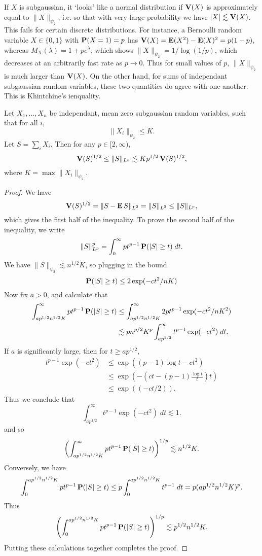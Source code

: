 If $X$ is subgaussian, it `looks' like a normal distribution if $\operatorname{\mathbf{V}}(X)$ is approximately equal to $\| X \|_{\psi_2}$, i.e. so that with very large probability we have $|X| \lesssim \operatorname{\mathbf{V}}(X)$. This fails for certain discrete distributions. For instance, a Bernoulli random variable $X \in \{ 0, 1 \}$ with $\mathbf{P}(X = 1) = p$ has $\operatorname{\mathbf{V}}(X) = \operatorname{\mathbf{E}}(X^2) - \operatorname{\mathbf{E}}(X)^2 = p(1-p)$, whereas $M_X(\lambda) = 1 + pe^\lambda$, which shows $\| X \|_{\psi_2} = 1/\log(1/p)$, which decreases at an arbitrarily fast rate as $p \to 0$. Thus for small values of $p$, $\| X \|_{\psi_2}$ is much larger than $\operatorname{\mathbf{V}}(X)$. On the other hand, for sums of independant subgaussian random variables, these two quantities do agree with one another. This is Khintchine's ienquality.

\begin{theorem}[Khintchine]
    Let $X_1, \dots, X_n$ be independant, mean zero subgaussian random variables, such that for all $i$,
    \[ \| X_i \|_{\psi_2} \leq K. \]
    Let $S = \sum_i X_i$. Then for any $p \in [2,\infty)$,
    \[ \operatorname{\mathbf{V}}(S)^{1/2} \leq \| S \|_{L^p} \lesssim K p^{1/2} \operatorname{\mathbf{V}}(S)^{1/2}, \]
    where $K = \max \| X_i \|_{\psi_2}$.
\end{theorem}
\begin{proof}
    We have
    \[ \operatorname{\mathbf{V}}(S)^{1/2} = \| S - \operatorname{\mathbf{E}} S \|_{L^2} = \| S \|_{L^2} \leq \| S \|_{L^p}, \]
    which gives the first half of the inequality. To prove the second half of the inequality, we write
    \[ \| S \|_{L^p}^p = \int_0^\infty pt^{p-1} \operatorname{\mathbf{P}}(|S| \geq t)\; dt. \]
    We have $\| S \|_{\psi_2} \lesssim n^{1/2} K$, so plugging in the bound
    \[ \operatorname{\mathbf{P}}(|S| \geq t) \leq 2 \exp(- c t^2 / n K) \]
    Now fix $a > 0$, and calculate that
    \begin{align*}
        \int_{a p^{1/2} n^{1/2} K}^\infty pt^{p-1} \operatorname{\mathbf{P}}(|S| \geq t) &\leq \int_{a p^{1/2} n^{1/2} K }^\infty 2pt^{p-1} \exp( - c t^2 / n K^2 )\\
        &\lesssim p n^{p/2} K^p \int_{a p^{1/2}}^\infty t^{p-1} \exp( -   c t^2 )\; dt.
    \end{align*}
    If $a$ is significantly large, then for $t \geq a p^{1/2}$,
    \begin{align*}
        t^{p-1} \exp( - c t^2 ) &\leq \exp( (p-1) \log t - c t^2 )\\
        &\leq \exp \left( - \left( ct - (p-1) \frac{\log t}{t} \right) t \right)\\
        &\leq \exp \left( \left( - ct/2 \right) \right).
    \end{align*}
    Thus we conclude that
    \[ \int_{a p^{1/2}}^\infty t^{p-1} \exp( -   c t^2 )\; dt \lesssim 1. \]
    and so
    \[ \left( \int_{a p^{1/2} n^{1/2} K}^\infty pt^{p-1} \operatorname{\mathbf{P}}(|S| \geq t) \right)^{1/p} \lesssim n^{1/2} K.  \]
    Conversely, we have
    \[ \int_0^{a p^{1/2} n^{1/2} K} pt^{p-1} \operatorname{\mathbf{P}}(|S| \geq t) \leq p \int_0^{a p^{1/2} n^{1/2} K} t^{p-1}\; dt = p (a p^{1/2} n^{1/2} K)^p. \]
    Thus
    \[ \left( \int_0^{a p^{1/2} n^{1/2} K} pt^{p-1} \operatorname{\mathbf{P}}(|S| \geq t) \right)^{1/p} \lesssim p^{1/2} n^{1/2} K. \]
    Putting these calculations together completes the proof.
\end{proof}

